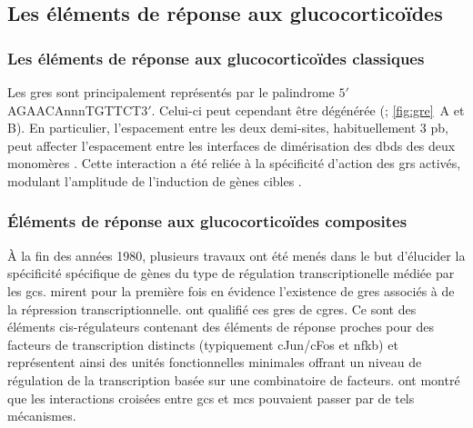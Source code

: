 \documentclass[../main.tex]{subfiles}
\begin{document}

	\subsection{Les éléments de réponse aux glucocorticoïdes}

		\subsubsection{Les éléments de réponse aux glucocorticoïdes classiques}
			Les \glspl{gre} sont principalement représentés par le palindrome $5\prime$AGAACAnnnTGTTCT$3\prime$.
			Celui-ci peut cependant être dégénérée (\citealp{Nordeen1990}; \autoref{fig:gre}~A et B).
			En particulier, l'espacement entre les deux demi-sites, habituellement 3 \gls{pb}, peut affecter l'espacement entre les interfaces de dimérisation des \glspl{dbd} des deux monomères \citep{Watson2013}.
			Cette interaction a été reliée à la spécificité d'action des \glspl{gr} activés, modulant l'amplitude de l'induction de gènes cibles \citep{Meijsing2009}.
				
			

		\subsubsection{Éléments de réponse aux glucocorticoïdes composites}
			À la fin des années 1980, plusieurs travaux ont été menés dans le but d'élucider la spécificité spécifique de gènes du type de régulation transcriptionelle médiée par les \glspl{gc}.
			\citet{Sakai1988} mirent pour la première fois en évidence l'existence de \glspl{gre} associés à de la répression transcriptionnelle.
			\citet{Diamond1990} ont qualifié ces \glspl{gre} de \glspl{cgre}.
			Ce sont des éléments cis-régulateurs contenant des éléments de réponse proches pour des facteurs de transcription distincts (typiquement cJun/cFos et \gls{nfkb}) et représentent ainsi des unités fonctionnelles minimales offrant un niveau de régulation de la transcription basée sur une combinatoire de facteurs.
			\citet{Pearce1993} ont montré que les interactions croisées entre \glspl{gc} et \glspl{mc} pouvaient passer par de tels mécanismes.
\end{document}
